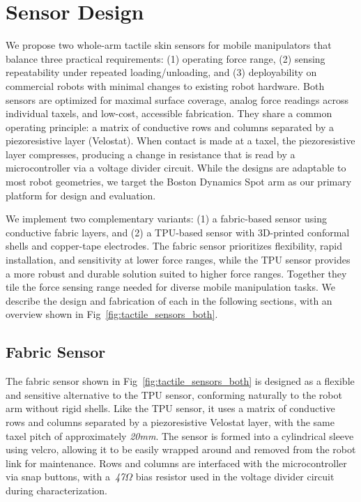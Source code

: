 \section{Sensor Design}
We propose two whole-arm tactile skin sensors for mobile manipulators that balance three practical requirements: (1) operating force range, (2) sensing repeatability under repeated loading/unloading, and (3) deployability on commercial robots with minimal changes to existing robot hardware. Both sensors are optimized for maximal surface coverage, analog force readings across individual taxels, and low-cost, accessible fabrication. They share a common operating principle: a matrix of conductive rows and columns separated by a piezoresistive layer (Velostat). When contact is made at a taxel, the piezoresistive layer compresses, producing a change in resistance that is read by a microcontroller via a voltage divider circuit. While the designs are adaptable to most robot geometries, we target the Boston Dynamics Spot arm as our primary platform for design and evaluation.

We implement two complementary variants: (1) a fabric-based sensor using conductive fabric layers, and (2) a TPU-based sensor with 3D-printed conformal shells and copper-tape electrodes. The fabric sensor prioritizes flexibility, rapid installation, and sensitivity at lower force ranges, while the TPU sensor provides a more robust and durable solution suited to higher force ranges. Together they tile the force sensing range needed for diverse mobile manipulation tasks. We describe the design and fabrication of each in the following sections, with an overview shown in Fig~\ref{fig:tactile_sensors_both}.

\subsection{Fabric Sensor}
The fabric sensor shown in Fig~\ref{fig:tactile_sensors_both} is designed as a flexible and sensitive alternative to the TPU sensor, conforming naturally to the robot arm without rigid shells. Like the TPU sensor, it uses a matrix of conductive rows and columns separated by a piezoresistive Velostat layer, with the same taxel pitch of approximately \textit{20mm}. The sensor is formed into a cylindrical sleeve using velcro, allowing it to be easily wrapped around and removed from the robot link for maintenance. Rows and columns are interfaced with the microcontroller via snap buttons, with a~\textit{47$\Omega$} bias resistor used in the voltage divider circuit during characterization.

